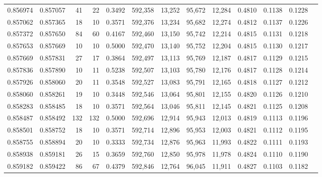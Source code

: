 \begin{tabular}{rrrrrrrrrrrrr}
0.856974 & 0.857057 &    41 &  22 &                                     0.3492 & 592,358 &  13,252 &  95,672 &  12,284 & 0.4810 & 0.1138 & 0.1228 \\
0.857062 & 0.857365 &    18 &  10 &                                     0.3571 & 592,376 &  13,234 &  95,682 &  12,274 & 0.4812 & 0.1137 & 0.1226 \\
0.857372 & 0.857650 &    84 &  60 &                                     0.4167 & 592,460 &  13,150 &  95,742 &  12,214 & 0.4815 & 0.1131 & 0.1218 \\
0.857653 & 0.857669 &    10 &  10 &                                     0.5000 & 592,470 &  13,140 &  95,752 &  12,204 & 0.4815 & 0.1130 & 0.1217 \\
0.857669 & 0.857831 &    27 &  17 &                                     0.3864 & 592,497 &  13,113 &  95,769 &  12,187 & 0.4817 & 0.1129 & 0.1215 \\
0.857836 & 0.857890 &    10 &  11 &                                     0.5238 & 592,507 &  13,103 &  95,780 &  12,176 & 0.4817 & 0.1128 & 0.1214 \\
0.857926 & 0.858060 &    20 &  11 &                                     0.3548 & 592,527 &  13,083 &  95,791 &  12,165 & 0.4818 & 0.1127 & 0.1212 \\
0.858060 & 0.858261 &    19 &  10 &                                     0.3448 & 592,546 &  13,064 &  95,801 &  12,155 & 0.4820 & 0.1126 & 0.1210 \\
0.858283 & 0.858485 &    18 &  10 &                                     0.3571 & 592,564 &  13,046 &  95,811 &  12,145 & 0.4821 & 0.1125 & 0.1208 \\
0.858487 & 0.858492 &   132 & 132 &                                     0.5000 & 592,696 &  12,914 &  95,943 &  12,013 & 0.4819 & 0.1113 & 0.1196 \\
0.858501 & 0.858752 &    18 &  10 &                                     0.3571 & 592,714 &  12,896 &  95,953 &  12,003 & 0.4821 & 0.1112 & 0.1195 \\
0.858755 & 0.858894 &    20 &  10 &                                     0.3333 & 592,734 &  12,876 &  95,963 &  11,993 & 0.4822 & 0.1111 & 0.1193 \\
0.858938 & 0.859181 &    26 &  15 &                                     0.3659 & 592,760 &  12,850 &  95,978 &  11,978 & 0.4824 & 0.1110 & 0.1190 \\
0.859182 & 0.859422 &    86 &  67 &                                     0.4379 & 592,846 &  12,764 &  96,045 &  11,911 & 0.4827 & 0.1103 & 0.1182 \\

\end{tabular}
